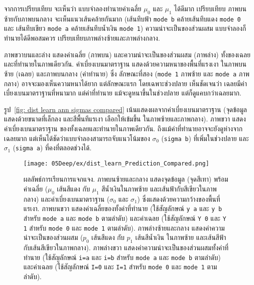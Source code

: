 \begin{Exercise}
จากการเปรียบเทียบ
จะเห็นว่า
แบบจำลองทำนายค่าเฉลี่ย
$\mu_0$ และ $\mu_1$ ได้ดีมาก
เปรียบเทียบ ภาพบนซ้ายกับภาพบนกลาง
จะเห็นแนวเส้นคล้ายกันมาก (เส้นทึบฟ้า \texttt{mode b} คล้ายเส้นทึบแดง \texttt{mode 0} และ เส้นทึบเขียว \texttt{mode a} คล้ายเส้นทึบน้ำเงิน \texttt{mode 1})
ความน่าจะเป็นของส่วนผสม
แบบจำลองก็ทำนายได้ดีพอสมควร 
เปรียบเทียบภาพล่างซ้ายและภาพล่างกลาง.

ภาพขวาบนและล่าง แสดงค่าเฉลี่ย (ภาพบน) และความน่าจะเป็นของส่วนผสม (ภาพล่าง)
ทั้งของเฉลยและที่ทำนายในภาพเดียวกัน.
%
ค่าเบี่ยงเบนมาตราฐาน แสดงด้วยความหนาของพื้นที่แรงเงา ในภาพบนซ้าย (เฉลย)
และภาพบนกลาง (ค่าทำนาย)
ซึ่ง
ลักษณะที่สอง (\texttt{mode 1} ภาพซ้าย และ \texttt{mode a} ภาพกลาง)
อาจจะมองเห็นความหนาได้ยาก
แต่ลักษณะแรก
โดยเฉพาะช่วงปลาย
เห็นชัดเจนว่า
เฉลยมีค่าเบี่ยงเบนมาตราฐานที่หนามาก
แต่ค่าที่ทำนาย แม้จะดูหนาขึ้นในช่วงปลาย แต่ก็ดูแคบกว่าเฉลยมาก.

รูป~\ref{fig: dist learn ann sigmas compared}
เน้นแสดงผลจากค่าเบี่ยงเบนมาตราฐาน (จุดข้อมูลแสดงด้วยขนาดที่เล็กลง และสีพื้นทีแรเงา เลือกให้เข้มขึ้น ในภาพซ้ายและภาพกลาง).
ภาพขวา แสดงค่าเบี่ยงเบนมาตราฐาน
ของทั้งเฉลยและทำนายในภาพเดียวกัน.
ถึงแม้ค่าที่ทำนายอาจจะยังดูห่างจากเฉลยมาก แต่เห็นได้ชัดว่าแบบจำลองสามารถจับแนวโน้มของ $\sigma_0$ (\texttt{sigma b}) ที่เพิ่มในช่วงปลาย
และ $\sigma_1$ (\texttt{sigma a}) ที่คงที่ตลอดช่วงได้.

%

%
\begin{figure}[H]
\begin{center}
\texttt{[image: 05Deep/ex/dist\_learn\_Prediction\_Compared.png]}
\caption[ผลลัพธ์การเรียนการแจกแจง]{ผลลัพธ์การเรียนการแจกแจง.
ภาพบนซ้ายและกลาง แสดงจุดข้อมูล (จุดสีเทา) พร้อมค่าเฉลี่ย ($\mu_0$ เส้นสีแดง กับ $\mu_1$ สีน้ำเงินในภาพซ้าย และเส้นฟ้ากับสีเขียวในภาพกลาง)
และค่าเบี่ยงเบนมาตราฐาน ($\sigma_0$ และ $\sigma_1$) ซึ่งแสดงด้วยความกว้างของพื้นที่แรเงา.
ภาพบนขวา
แสดงค่าเฉลี่ยของทั้งค่าที่ทำนาย (ใช้สัญลักษณ์ \texttt{y a} และ \texttt{y b} สำหรับ \texttt{mode a} และ \texttt{mode b} ตามลำดับ) และค่าเฉลย
(ใช้สัญลักษณ์ \texttt{Y 0} และ \texttt{Y 1} สำหรับ \texttt{mode 0} และ \texttt{mode 1} ตามลำดับ).
ภาพล่างซ้ายและกลาง 
แสดงค่าความน่าจะเป็นของส่วนผสม
($p_0$ เส้นสีแดง กับ $p_1$ เส้นสีน้ำเงิน ในภาพซ้าย
และเส้นสีฟ้ากับเส้นสีเขียวในภาพกลาง).
ภาพล่างขวา
แสดงค่าความน่าจะเป็นของส่วนผสมทั้งค่าที่ทำนาย (ใช้สัญลักษณ์ \texttt{i=a} และ \texttt{i=b} สำหรับ \texttt{mode a} และ \texttt{mode b} ตามลำดับ) และค่าเฉลย
(ใช้สัญลักษณ์ \texttt{I=0} และ \texttt{I=1} สำหรับ \texttt{mode 0} และ \texttt{mode 1} ตามลำดับ).
}
\label{fig: dist learn ann results compared}
\end{center}
\end{figure}




\end{Exercise}
